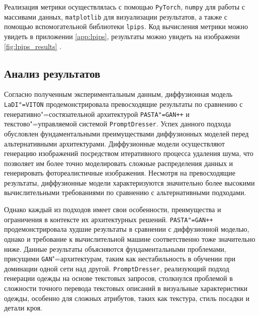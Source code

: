 Реализация метрики осуществлялась с помощью \texttt{PyTorch}, \texttt{numpy} для работы с массивами данных, \texttt{matplotlib} для визуализации результатов, а также с помощью вспомогательной библиотеки \texttt{lpips}. Код вычисления метрики можно увидеть в приложении \ref{app:lpips}, результаты можно увидеть на изображени \ref{fig:lpips_results} \cite{lpips}.

\subsection{Анализ результатов}
Согласно полученным экспериментальным данным, диффузионная модель \texttt{LaDI"=VITON} продемонстрировала превосходящие результаты по сравнению с генеративно"=состязательной архитектурой \texttt{PASTA"=GAN++} и текстово"=управляемой системой \texttt{PromptDresser}. Успех данного подхода обусловлен фундаментальными преимуществами диффузионных моделей перед альтернативными архитектурами. Диффузионные модели осуществляют генерацию изображений посредством итеративного процесса удаления шума, что позволяет им более точно моделировать сложные распределения данных и генерировать фотореалистичные изображения. Несмотря на превосходящие результаты, диффузионные модели характеризуются значительно более высокими вычислительными требованиями по сравнению с альтернативными подходами.

Однако каждый из подходов имеет свои особенности, преимущества и ограничения в контексте их архитектурных решений.
\texttt{PASTA"=GAN++} продемонстрировала худшие результаты в сравнении с диффузионной моделью, однако и требование к вычислительной машине соответственно тоже значительно ниже. Данные результаты объясняются фундаментальными проблемами, присущими \texttt{GAN}"=архитектурам, таким как нестабильность в обучении при доминации одной сети над другой. \texttt{PromptDresser}, реализующий подход генерации одежды на основе текстовых запросов, столкнулся проблемой в сложности точного перевода текстовых описаний в визуальные характеристики одежды, особенно для сложных атрибутов, таких как текстура, стиль посадки и детали кроя.
